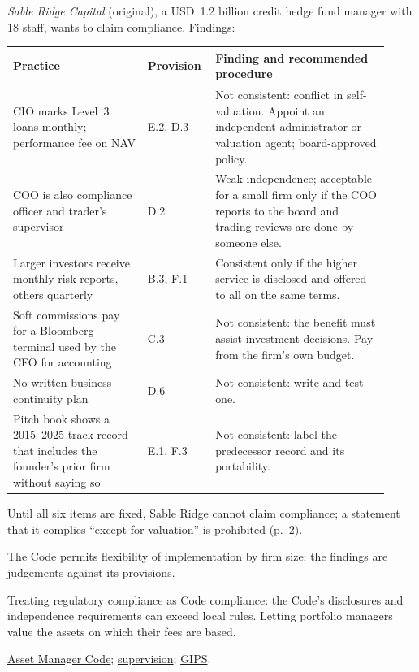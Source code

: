 \begin{qfmethod}
 \emph{Sable Ridge Capital} (original), a USD~1.2 billion credit hedge fund manager with 18 staff, wants to claim compliance. Findings:
\begin{center}\small
\begin{tabular}{@{}p{0.34\linewidth}p{0.14\linewidth}p{0.44\linewidth}@{}}
\toprule
Practice & Provision & Finding and recommended procedure \\
\midrule
CIO marks Level~3 loans monthly; performance fee on NAV & E.2, D.3 & Not consistent: conflict in self-valuation. Appoint an independent administrator or valuation agent; board-approved policy. \\
COO is also compliance officer and trader's supervisor & D.2 & Weak independence; acceptable for a small firm only if the COO reports to the board and trading reviews are done by someone else. \\
Larger investors receive monthly risk reports, others quarterly & B.3, F.1 & Consistent only if the higher service is disclosed and offered to all on the same terms. \\
Soft commissions pay for a Bloomberg terminal used by the CFO for accounting & C.3 & Not consistent: the benefit must assist investment decisions. Pay from the firm's own budget. \\
No written business-continuity plan & D.6 & Not consistent: write and test one. \\
Pitch book shows a 2015--2025 track record that includes the founder's prior firm without saying so & E.1, F.3 & Not consistent: label the predecessor record and its portability. \\
\bottomrule
\end{tabular}
\end{center}
Until all six items are fixed, Sable Ridge cannot claim compliance; a statement that it complies ``except for valuation'' is prohibited (p.~2).

 The Code permits flexibility of implementation by firm size; the findings are judgements against its provisions.

 Treating regulatory compliance as Code compliance: the Code's disclosures and independence requirements can exceed local rules. Letting portfolio managers value the assets on which their fees are based.

 \hyperref[def:asset-manager-code]{Asset Manager Code}; \hyperref[meth:preventing-employer-duty-violations]{supervision}; \hyperref[meth:gips-composite-presentation]{GIPS}.

\end{qfmethod}
